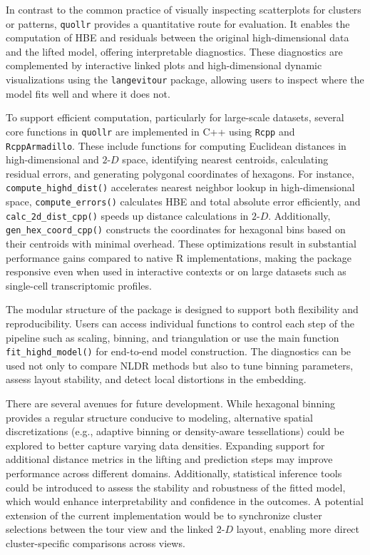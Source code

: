In contrast to the common practice of visually inspecting scatterplots for clusters or patterns, \texttt{quollr} provides a quantitative route for evaluation. It enables the computation of HBE and residuals between the original high-dimensional data and the lifted model, offering interpretable diagnostics. These diagnostics are complemented by interactive linked plots and high-dimensional dynamic visualizations using the \texttt{langevitour} package, allowing users to inspect where the model fits well and where it does not.

To support efficient computation, particularly for large-scale datasets, several core functions in \texttt{quollr} are implemented in C++ using \texttt{Rcpp} and \texttt{RcppArmadillo}. These include functions for computing Euclidean distances in high-dimensional and \(2\text{-}D\) space, identifying nearest centroids, calculating residual errors, and generating polygonal coordinates of hexagons. For instance, \texttt{compute\_highd\_dist()} accelerates nearest neighbor lookup in high-dimensional space, \texttt{compute\_errors()} calculates HBE and total absolute error efficiently, and \texttt{calc\_2d\_dist\_cpp()} speeds up distance calculations in \(2\text{-}D\). Additionally, \texttt{gen\_hex\_coord\_cpp()} constructs the coordinates for hexagonal bins based on their centroids with minimal overhead. These optimizations result in substantial performance gains compared to native R implementations, making the package responsive even when used in interactive contexts or on large datasets such as single-cell transcriptomic profiles.

The modular structure of the package is designed to support both flexibility and reproducibility. Users can access individual functions to control each step of the pipeline such as scaling, binning, and triangulation or use the main function \texttt{fit\_highd\_model()} for end-to-end model construction. The diagnostics can be used not only to compare NLDR methods but also to tune binning parameters, assess layout stability, and detect local distortions in the embedding.

There are several avenues for future development. While hexagonal binning provides a regular structure conducive to modeling, alternative spatial discretizations (e.g., adaptive binning or density-aware tessellations) could be explored to better capture varying data densities. Expanding support for additional distance metrics in the lifting and prediction steps may improve performance across different domains. Additionally, statistical inference tools could be introduced to assess the stability and robustness of the fitted model, which would enhance interpretability and confidence in the outcomes. A potential extension of the current implementation would be to synchronize cluster selections between the tour view and the linked \(2\text{-}D\) layout, enabling more direct cluster-specific comparisons across views.

